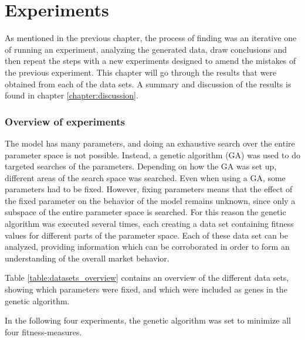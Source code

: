 \part{Experiments}\label{chapter:experiments_and_results}
As mentioned in the previous chapter, the process of finding was an iterative one of running an experiment, analyzing the generated data, draw conclusions and then repeat the steps with a new experiments designed to amend the mistakes of the previous experiment. This chapter will go through the results that were obtained from each of the data sets. A summary and discussion of the results is found in chapter \ref{chapter:discussion}.

\section{Overview of experiments}\label{section:experiments_overview}
The model has many parameters, and doing an exhaustive search over the entire parameter space is not possible. Instead, a genetic algorithm (GA) was used to do targeted searches of the parameters. Depending on how the GA was set up, different areas of the search space was searched. Even when using a GA, some parameters had to be fixed. However, fixing parameters means that the effect of the fixed parameter on the behavior of the model remains unknown, since only a subspace of the entire parameter space is searched. For this reason the genetic algorithm was executed several times, each creating a data set containing fitness values for different parts of the parameter space. Each of these data set can be analyzed, providing information which can be corroborated in order to form an understanding of the overall market behavior.

Table \ref{table:datasets_overview} contains an overview of the different data sets, showing which parameters were fixed, and which were included as genes in the genetic algorithm.

In the following four experiments, the genetic algorithm was set to minimize all four fitness-measures.

